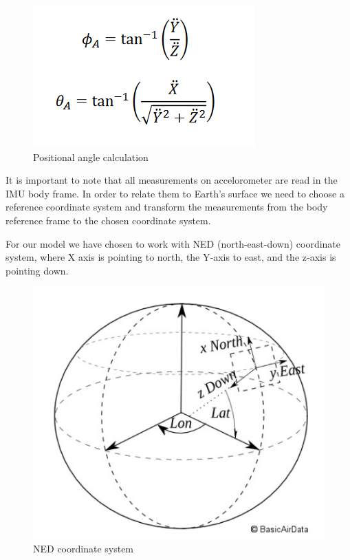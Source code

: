 \begin{figure}[H]
    \begin{center}
    \includegraphics[scale = 0.7]{pictures/IMU/Accel_angles.png}
    \end{center}
    \caption{Positional angle calculation   }
    \label{fig:my_label}
\end{figure}

It is important to note that all measurements on accelorometer are read in the IMU body frame. In order to relate them to Earth's surface we need to choose a reference coordinate system and transform the measurements from the body reference frame to the chosen coordinate system.

For our model we have chosen to work with NED (north-east-down) coordinate system, where X axis is pointing to north, the Y‐axis to east, and the z‐axis is pointing down.

\begin{figure}[H]
    \begin{center}
    \includegraphics[scale = 0.5]{pictures/IMU/NED_sys.png}
    \end{center}
    \caption{NED coordinate system}
    \label{fig:my_label}
\end{figure}

